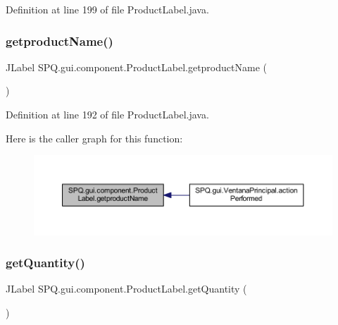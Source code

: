 Definition at line 199 of file Product\+Label.\+java.

\mbox{\label{class_s_p_q_1_1gui_1_1component_1_1_product_label_a614cfb4f7e9b89e21e7225ac7c93ef2c}} 
\subsubsection{\texorpdfstring{getproduct\+Name()}{getproductName()}}
{\footnotesize\ttfamily J\+Label S\+P\+Q.\+gui.\+component.\+Product\+Label.\+getproduct\+Name (\begin{DoxyParamCaption}{ }\end{DoxyParamCaption})}



Definition at line 192 of file Product\+Label.\+java.

Here is the caller graph for this function\+:
\nopagebreak
\begin{figure}[H]
\begin{center}
\leavevmode
\includegraphics[width=350pt]{class_s_p_q_1_1gui_1_1component_1_1_product_label_a614cfb4f7e9b89e21e7225ac7c93ef2c_icgraph}
\end{center}
\end{figure}
\mbox{\label{class_s_p_q_1_1gui_1_1component_1_1_product_label_adcfdea4cb072291bea24728bf75aac10}} 
\subsubsection{\texorpdfstring{get\+Quantity()}{getQuantity()}}
{\footnotesize\ttfamily J\+Label S\+P\+Q.\+gui.\+component.\+Product\+Label.\+get\+Quantity (\begin{DoxyParamCaption}{ }\end{DoxyParamCaption})}



